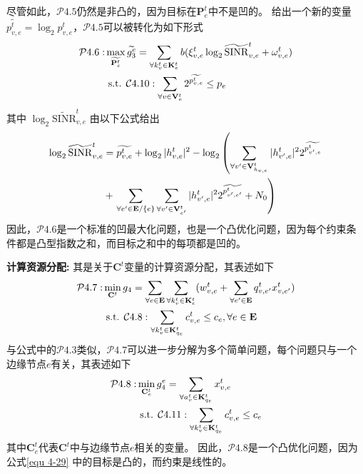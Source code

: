 尽管如此，$\mathcal{P}4.5$仍然是非凸的，因为目标在$\mathbf{P}_{e}^{t}$中不是凹的。
给出一个新的变量$\widetilde{p_{v, e}^t} = \log _{2} {p}_{v, e}^t$，$\mathcal{P}4.5$可以被转化为如下形式
\begin{align}
	\mathcal{P}4.6: & \max_{\widetilde{\mathbf{{P}}_{e}^{t}}}  \widetilde{g_3^{e}}= \sum_{\forall k_{v}^{t} \in \mathbf{K}_{e}^{t}} {b ( \xi_{v, e}^{t} \log _{2}\mathrm{\widetilde{SINR}}_{v, e}^t + \omega_{v, e}^{t} ) } \notag \\
	&\text { s.t. } \mathcal{C}4.10: \sum_{\forall v \in \mathbf{V}_{e}^{t}} 2^{\widetilde{p_{v, e}^t}} \leq p_{e}  
\end{align}
其中 $\log _{2}\mathrm{\widetilde{SINR}}_{v, e}^t$ 由以下公式给出
\begin{align}
	\log _{2}\mathrm{\widetilde{SINR}}_{v, e}^t &= \widetilde{p_{v, e}^t} + \log _{2} |h_{v, e}^t| ^{2} - \log _{2} \left( \sum\limits_{\forall v^{\prime} \in \mathbf{V}_{h_{v, e}}^{t}} |h_{v^{\prime}, e}^t|^2 2^{\widetilde{p_{v^{\prime}, e}^{t}}} \right. \notag \\
	&+ \left. \sum\limits_{\forall e^{\prime} \in \mathbf{E} / \{e\}} \sum\limits_{\forall v^{\prime} \in \mathbf{V}_{e^{\prime}}^{t}} |h_{v^{\prime}, e}^t|^2 2^{\widetilde{p_{v^{\prime}, e^{\prime}}^{t}}} + N_{0}\right)
\end{align}
\noindent 因此，$\mathcal{P}4.6$是一个标准的凹最大化问题，也是一个凸优化问题，因为每个约束条件都是凸型指数之和，而目标之和中的每项都是凹的。

\textbf{计算资源分配:} 其是关于$\mathbf{C}^{t}$变量的计算资源分配，其表述如下
\begin{align}
	\mathcal{P}4.7: &\min_{\mathbf{C}^{t}} g_4= \sum_{ \forall e \in \mathbf{E}} \sum_{\forall k_{v}^{t} \in \mathbf{K}_{e}^{t}} ( w_{v, e}^{t} + \sum_{\forall e^{\prime} \in \mathbf{E}} q_{v, e^{\prime}}^{t} x_{v, e^{\prime}}^t) \notag \\
	&\text { s.t. } \mathcal{C}4.8:  \sum_{\forall k_{v}^{t} \in {\mathbf{K}_{q_e}^{t} }} c_{v, e}^t \leq c_{e}, \forall e \in \mathbf{E}
\end{align}
与公式中的$\mathcal{P}4.3$类似，$\mathcal{P}4.7$可以进一步分解为多个简单问题，每个问题只与一个边缘节点$e$有关，其表述如下
\begin{align}
	\mathcal{P}4.8: &\min_{\mathbf{C}_{e}^{t}} g_4^e= \sum_{\forall a_{v}^{t} \in {\mathbf{K}_{q_e}^{t} }}   x_{v, e}^t \notag \\
	&\text { s.t. } \mathcal{C}4.11:  \sum_{\forall k_{v}^{t} \in {\mathbf{K}_{q_e}^{t} }} {c_{v, e}^t} \leq c_{e}
\label{equ 4-29}
\end{align}
\noindent 其中${\mathbf{C}_e^t}$代表${\mathbf{C}^{t}}$中与边缘节点$e$相关的变量。
因此，$\mathcal{P}4.8$是一个凸优化问题，因为公式\ref{equ 4-29} 中的目标是凸的，而约束是线性的。

